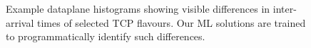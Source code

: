 \begin{figure}[t]
    \centering
    \begin{subfigure}[t]{0.49\linewidth}
        \centering
        \label{fig:cubic-hist-app}
    \end{subfigure}
    \begin{subfigure}[t]{0.49\linewidth}
        \centering
        \label{fig:bbr-hist-app}
    \end{subfigure}
    \caption{Example dataplane histograms showing visible differences in inter-arrival times of selected TCP flavours. Our ML solutions are trained to programmatically identify such differences.}
    \label{fig:tcp-hist-app}
\end{figure}

